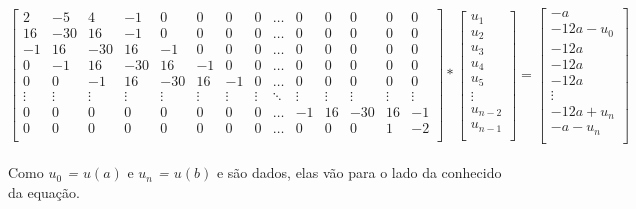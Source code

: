 \documentclass[a4paper,10pt]{article}
\begin{document}
  \setcounter{MaxMatrixCols}{20}
  {\tiny{
  \[
  \begin{bmatrix}
  	 2 & -5 & 4 & -1  & 0 & 0 & 0 & 0 & \dots & 0 & 0 & 0 & 0 & 0\\
  	 16 & -30 & 16 & -1  & 0 & 0 & 0 & 0 & \dots & 0 & 0 & 0 & 0 & 0\\
  	 -1 & 16 & -30 & 16  & -1 & 0 & 0 & 0 & \dots & 0 & 0 & 0 & 0 & 0\\
  	 0 & -1 & 16 & -30  & 16 & -1 & 0 & 0 & \dots & 0 & 0 & 0 & 0 & 0 \\
  	 0 & 0  & -1 & 16  & -30 & 16 & -1 & 0 & \dots & 0 & 0 & 0 & 0 & 0 \\
  	 \vdots & \vdots & \vdots &\vdots &\vdots & \vdots & \vdots & \vdots & \ddots & \vdots & \vdots & \vdots & \vdots & \vdots \\
  	 0 &  0 & 0 & 0  & 0 & 0 & 0 & 0 &\dots & -1 & 16 & -30 & 16 & -1 \\
  	 0 &  0 & 0 & 0  & 0 & 0 & 0 & 0 &\dots & 0 & 0 & 0 & 1 & -2 \\
  \end{bmatrix}
  *
  \begin{bmatrix}
    u_{1}\\
    u_{2}\\
    u_{3}\\
    u_{4}\\
    u_{5}\\
    \vdots\\
    u_{n-2}\\
    u_{n-1}\\
  \end{bmatrix}
  =
  \begin{bmatrix}
  	-a\\
  	-12a -u_0\\
  	-12a\\
  	-12a\\
  	-12a\\
  	\vdots\\
  	-12a + u_n\\
  	-a - u_n\\
  \end{bmatrix}
  \]
  }
}\\
Como \textit{$u_0$ = $u(a)$} e \textit{$u_n$ = $u(b)$} e são dados, elas vão para o lado da conhecido da equação.
\end{document}
